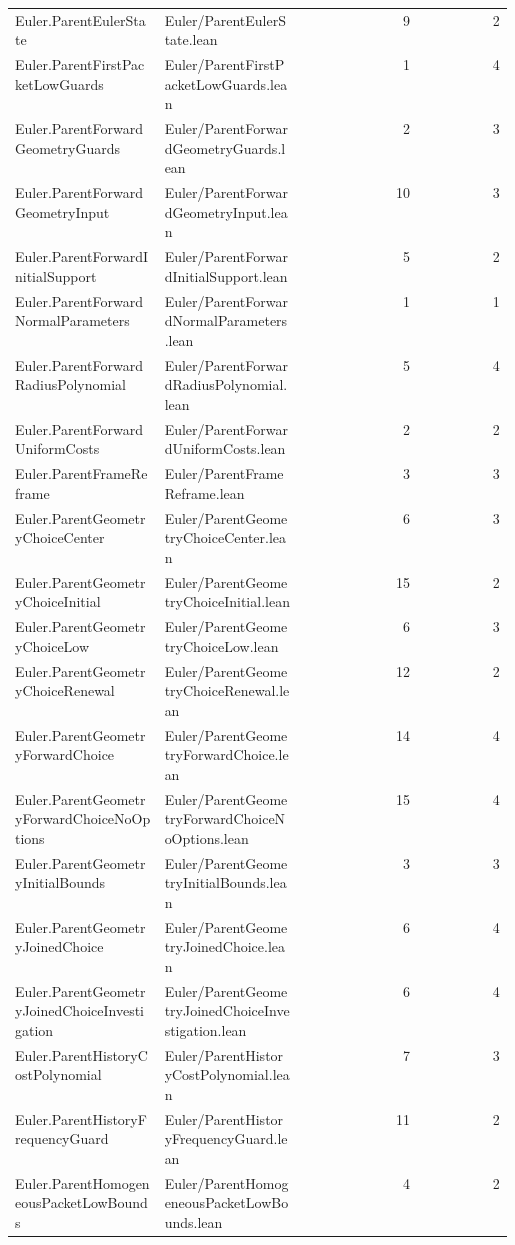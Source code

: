 \begin{longtable}{p{0.30\linewidth}p{0.28\linewidth}rr}
Euler.ParentEulerState & Euler/ParentEulerState.lean & 9 & 2\\
Euler.ParentFirstPacketLowGuards & Euler/ParentFirstPacketLowGuards.lean & 1 & 4\\
Euler.ParentForwardGeometryGuards & Euler/ParentForwardGeometryGuards.lean & 2 & 3\\
Euler.ParentForwardGeometryInput & Euler/ParentForwardGeometryInput.lean & 10 & 3\\
Euler.ParentForwardInitialSupport & Euler/ParentForwardInitialSupport.lean & 5 & 2\\
Euler.ParentForwardNormalParameters & Euler/ParentForwardNormalParameters.lean & 1 & 1\\
Euler.ParentForwardRadiusPolynomial & Euler/ParentForwardRadiusPolynomial.lean & 5 & 4\\
Euler.ParentForwardUniformCosts & Euler/ParentForwardUniformCosts.lean & 2 & 2\\
Euler.ParentFrameReframe & Euler/ParentFrameReframe.lean & 3 & 3\\
Euler.ParentGeometryChoiceCenter & Euler/ParentGeometryChoiceCenter.lean & 6 & 3\\
Euler.ParentGeometryChoiceInitial & Euler/ParentGeometryChoiceInitial.lean & 15 & 2\\
Euler.ParentGeometryChoiceLow & Euler/ParentGeometryChoiceLow.lean & 6 & 3\\
Euler.ParentGeometryChoiceRenewal & Euler/ParentGeometryChoiceRenewal.lean & 12 & 2\\
Euler.ParentGeometryForwardChoice & Euler/ParentGeometryForwardChoice.lean & 14 & 4\\
Euler.ParentGeometryForwardChoiceNoOptions & Euler/ParentGeometryForwardChoiceNoOptions.lean & 15 & 4\\
Euler.ParentGeometryInitialBounds & Euler/ParentGeometryInitialBounds.lean & 3 & 3\\
Euler.ParentGeometryJoinedChoice & Euler/ParentGeometryJoinedChoice.lean & 6 & 4\\
Euler.ParentGeometryJoinedChoiceInvestigation & Euler/ParentGeometryJoinedChoiceInvestigation.lean & 6 & 4\\
Euler.ParentHistoryCostPolynomial & Euler/ParentHistoryCostPolynomial.lean & 7 & 3\\
Euler.ParentHistoryFrequencyGuard & Euler/ParentHistoryFrequencyGuard.lean & 11 & 2\\
Euler.ParentHomogeneousPacketLowBounds & Euler/ParentHomogeneousPacketLowBounds.lean & 4 & 2\\

\end{longtable}
